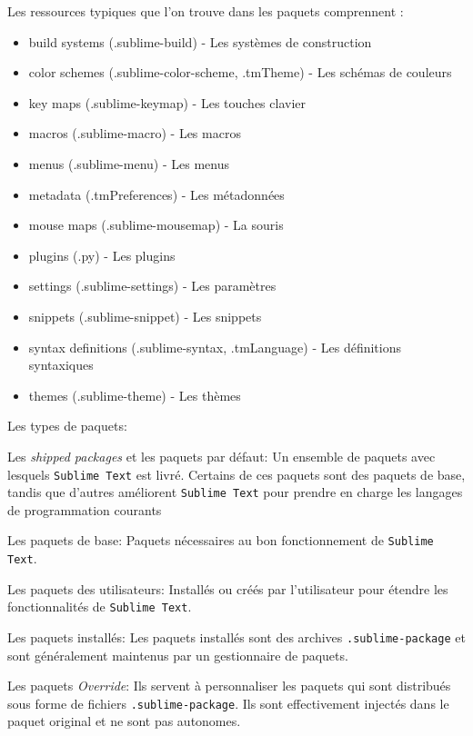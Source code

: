 \documentclass[french,a4paper]{article}
\begin{document}
Les ressources typiques que l'on trouve dans les paquets comprennent :
\begin{itemize}
    \item build systems (.sublime-build) - Les systèmes de construction
    \item color schemes (.sublime-color-scheme, .tmTheme) - Les schémas de couleurs
    \item key maps (.sublime-keymap) - Les touches clavier
    \item macros (.sublime-macro) - Les macros
    \item menus (.sublime-menu) - Les menus
    \item metadata (.tmPreferences) - Les métadonnées
    \item mouse maps (.sublime-mousemap) - La souris
    \item plugins (.py) - Les plugins
    \item settings (.sublime-settings) - Les paramètres
    \item snippets (.sublime-snippet) - Les snippets
    \item syntax definitions (.sublime-syntax, .tmLanguage) - Les définitions syntaxiques
    \item themes (.sublime-theme) - Les thèmes
\end{itemize}
\medskip

Les types de paquets:
\begin{description}
    \item{Les \textit{shipped packages} et les paquets par défaut}: Un ensemble de paquets avec lesquels \texttt{Sublime Text} est livré. Certains de ces paquets sont des paquets de base, tandis que d'autres améliorent \texttt{Sublime Text} pour prendre en charge les langages de programmation courants 
    \item{Les paquets de base}: Paquets nécessaires au bon fonctionnement de \texttt{Sublime Text}.
    \item{Les paquets des utilisateurs}: Installés ou créés par l'utilisateur pour étendre les fonctionnalités de \texttt{Sublime Text}.
    \item{Les paquets installés}: Les paquets installés sont des archives \texttt{.sublime-package} et sont généralement maintenus par un gestionnaire de paquets.
    \item{ Les paquets \textit{Override}}: Ils servent à personnaliser les paquets qui sont distribués sous forme de fichiers \texttt{.sublime-package}. Ils sont effectivement injectés dans le paquet original et ne sont pas autonomes.
\end{description}
\medskip
\end{document}
